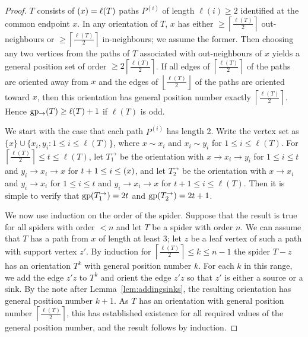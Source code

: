 \documentclass[a4paper,12pt]{article}
\theoremstyle{definition}
\newcommand{\gp}{{\rm gp}}
\newcommand{\lgp}{{\rm gp_{\rightarrow }}}
\let\deg\relax
\DeclareMathOperator {\deg} {deg}
\begin{document}
	\begin{proof}
		$T$ consists of $\deg (x) = \ell (T)$ paths $P^{(i)}$ of length $\ell (i) \geq 2$ identified at the common endpoint $x$. In any orientation of $T$, $x$ has either $\geq \left \lceil \frac{\ell (T)}{2} \right \rceil $ out-neighbours or $\geq \left \lceil \frac{\ell (T)}{2} \right \rceil $ in-neighbours; we assume the former. Then choosing any two vertices from the paths of $T$ associated with out-neighbours of $x$ yields a general position set of order $\geq 2\left \lceil \frac{\ell (T)}{2} \right \rceil $. If all edges of $\left \lceil \frac{\ell (T)}{2} \right \rceil$ of the paths are oriented away from $x$ and the edges of $\left \lfloor \frac{\ell (T)}{2} \right \rfloor $ of the paths are oriented toward $x$, then this orientation has general position number exactly $\left \lceil \frac{\ell (T)}{2} \right \rceil$. Hence $\lgp (T) \geq \ell (T)+1$ if $\ell (T)$ is odd. 
		
		We start with the case that each path $P^{(i)}$ has length 2. Write the vertex set as $\{ x\} \cup \{ x_i,y_i:1 \leq i \leq \ell (T) \} $, where $x \sim x_i$ and $x_i \sim y_i$ for $1 \leq i \leq \ell (T)$. For $\left \lceil \frac{\ell (T)}{2} \right \rceil \leq t \leq \ell (T) $, let $T_1^{\rightarrow }$ be the orientation with $x \rightarrow x_i \rightarrow y_i$ for $1 \leq i \leq t$ and $y_i \rightarrow x_i \rightarrow x$ for $t+1 \leq i \leq \deg(x)$, and let $T_2^{\rightarrow }$ be the orientation with $x \rightarrow x_i$ and $y_i \rightarrow x_i$ for $1 \leq i \leq t$ and $y_i \rightarrow x_i \rightarrow x$ for $t+1 \leq i \leq \ell (T)$. Then it is simple to verify that $\gp (T_1^{\rightarrow }) = 2t$ and $\gp (T_2^{\rightarrow }) = 2t+1$.
		
		We now use induction on the order of the spider. Suppose that the result is true for all spiders with order $< n$ and let $T$ be a spider with order $n$. We can assume that $T$ has a path from $x$ of length at least 3; let $z$ be a leaf vertex of such a path with support vertex $z'$. By induction for $\left \lceil \frac{\ell (T)}{2} \right \rceil \leq k \leq n-1$ the spider $T-z$ has an orientation $T^k$ with general position number $k$. For each $k$ in this range, we add the edge $z'z$ to $T^k$ and orient the edge $z'z$ so that $z'$ is either a source or a sink. By the note after Lemma~\ref{lem:addingsinks}, the resulting orientation has general position number $k+1$. As $T$ has an orientation with general position number $\left \lceil \frac{\ell (T)}{2} \right \rceil $, this has established existence for all required values of the general position number, and the result follows by induction.
	\end{proof}
	
\end{document}
